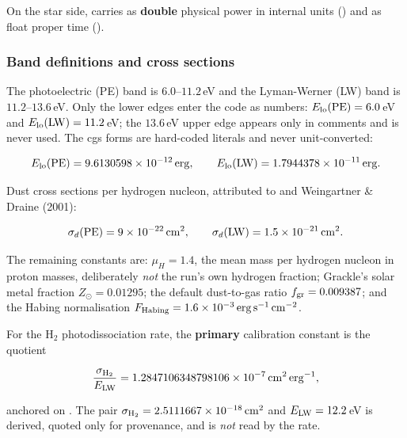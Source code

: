 On the star side,  carries
 as \textbf{double} physical power in internal
units () and  as float proper time
().

\subsubsection{Band definitions and cross sections}
\label{sec:isrf-eqdisc-bands}

The photoelectric (PE) band is $6.0$--$11.2$\,eV and the Lyman-Werner (LW) band
is $11.2$--$13.6$\,eV. Only the lower edges enter the code as numbers:
$E_{\rm lo}(\mathrm{PE}) = 6.0$\,eV and
$E_{\rm lo}(\mathrm{LW}) = 11.2$\,eV; the $13.6$\,eV
upper edge appears only in comments and is never used. The cgs forms are hard-coded
literals and never unit-converted:

\begin{equation}
  E_{\rm lo}(\mathrm{PE}) = 9.6130598\times10^{-12}\,{\rm erg}, \qquad
  E_{\rm lo}(\mathrm{LW}) = 1.7944378\times10^{-11}\,{\rm erg}.
  \label{eq:isrfd-band-edges}
\end{equation}

Dust cross sections per hydrogen nucleon, attributed
to \citet{Kim2023} and Weingartner \& Draine (2001):

\begin{equation}
  \sigma_d(\mathrm{PE}) = 9\times10^{-22}\,{\rm cm^2}, \qquad
  \sigma_d(\mathrm{LW}) = 1.5\times10^{-21}\,{\rm cm^2}.
  \label{eq:isrfd-sigma-d}
\end{equation}

The remaining constants are: $\mu_H = 1.4$, the mean mass per hydrogen nucleon in
proton masses, deliberately \emph{not} the run's own
hydrogen fraction; Grackle's solar metal fraction
$Z_\odot = 0.01295$; the default dust-to-gas ratio
$f_{\rm gr} = 0.009387$; and the Habing normalisation
$F_{\rm Habing} = 1.6\times10^{-3}\,{\rm erg\,s^{-1}\,cm^{-2}}$.

For the H$_2$ photodissociation rate, the \textbf{primary} calibration constant is
the quotient

\begin{equation}
  \frac{\sigma_{\rm H_2}}{E_{\rm LW}} = 1.2847106348798106\times10^{-7}\,{\rm cm^2\,erg^{-1}},
  \label{eq:isrfd-sigma-over-e}
\end{equation}

anchored on \citet{Sternberg2014}. The pair
$\sigma_{\rm H_2} = 2.5111667\times10^{-18}\,{\rm cm^2}$
and $E_{\rm LW} = 12.2$\,eV is
derived, quoted only for provenance, and is \emph{not} read by the rate.

